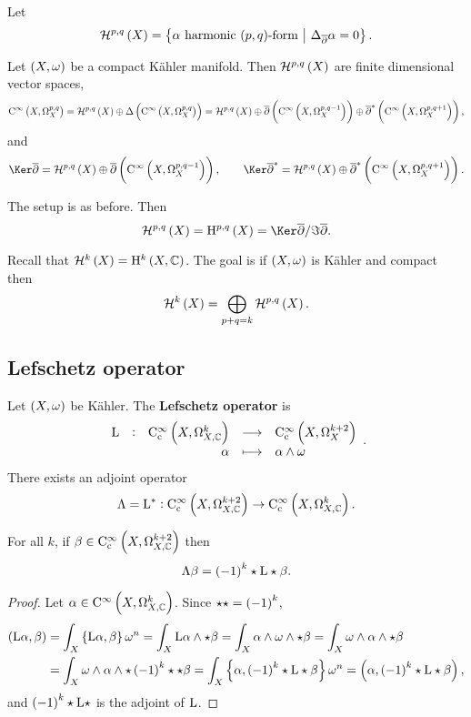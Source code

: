Let
$$ \HHH^{p, q}\br{X} = \cbr{\alpha \ \text{harmonic $ \br{p, q} $-form} \st \Delta_{\overline{\partial}}\alpha = 0}. $$

\begin{theorem}
Let $ \br{X, \omega} $ be a compact K\"ahler manifold. Then $ \HHH^{p, q}\br{X} $ are finite dimensional vector spaces,
$$ \C^\infty\br{X, \Omega_X^{p, q}} = \HHH^{p, q}\br{X} \oplus \Delta\br{\C^\infty\br{X, \Omega_X^{p, q}}} = \HHH^{p, q}\br{X} \oplus \overline{\partial}\br{\C^\infty\br{X, \Omega_X^{p, q - 1}}} \oplus \overline{\partial}^*\br{\C^\infty\br{X, \Omega_X^{p, q + 1}}}, $$
and
$$ \Ker \overline{\partial} = \HHH^{p, q}\br{X} \oplus \overline{\partial}\br{\C^\infty\br{X, \Omega_X^{p, q - 1}}}, \qquad \Ker \overline{\partial}^* = \HHH^{p, q}\br{X} \oplus \overline{\partial}^*\br{\C^\infty\br{X, \Omega_X^{p, q + 1}}}. $$
\end{theorem}

\begin{theorem}
\label{thm:6.22}
The setup is as before. Then
$$ \HHH^{p, q}\br{X} = \H^{p, q}\br{X} = \Ker \overline{\partial} / \Im \overline{\partial}. $$
\end{theorem}

Recall that $ \HHH^k\br{X} = \H^k\br{X, \CC} $. The goal is if $ \br{X, \omega} $ is K\"ahler and compact then
$$ \HHH^k\br{X} = \bigoplus_{p + q = k} \HHH^{p, q}\br{X}. $$

\subsection{Lefschetz operator}

\begin{definition}
Let $ \br{X, \omega} $ be K\"ahler. The \textbf{Lefschetz operator} is
$$ \function[\L]{\C_\c^\infty\br{X, \Omega_{X, \CC}^k}}{\C_\c^\infty\br{X, \Omega_X^{k + 2}}}{\alpha}{\alpha \wedge \omega}. $$
There exists an adjoint operator
$$ \Lambda = \L^* : \C_\c^\infty\br{X, \Omega_{X, \CC}^{k + 2}} \to \C_\c^\infty\br{X, \Omega_{X, \CC}^k}. $$
\end{definition}

\begin{lemma}
For all $ k $, if $ \beta \in \C_\c^\infty\br{X, \Omega_{X, \CC}^{k + 2}} $ then
$$ \Lambda\beta = \br{-1}^k\star\L\star\beta. $$
\end{lemma}

\begin{proof}
Let $ \alpha \in \C^\infty\br{X, \Omega_{X, \CC}^k} $. Since $ \star\star = \br{-1}^k $,
\begin{align*}
\br{\L\alpha, \beta}
& = \int_X \cbr{\L\alpha, \beta}\omega^n
= \int_X \L\alpha \wedge \star\beta
= \int_X \alpha \wedge \omega \wedge \star\beta
= \int_X \omega \wedge \alpha \wedge \star\beta \\
& = \int_X \omega \wedge \alpha \wedge \star\br{-1}^k\star\star\beta
= \int_X \cbr{\alpha, \br{-1}^k\star\L\star\beta}\omega^n
= \br{\alpha, \br{-1}^k\star\L\star\beta},
\end{align*}
and $ \br{-1}^k\star\L\star $ is the adjoint of $ \mathrm{L} $.
\end{proof}

